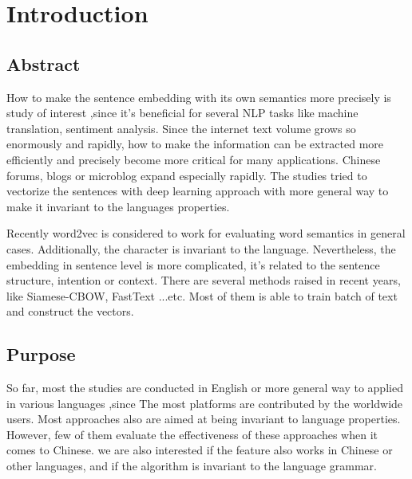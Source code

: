 \chapter{Introduction}
\setlength{\baselineskip}{1.5em}
\setlength{\parindent}{2em}
\setlength{\parskip}{1em}

\section{Abstract}

How to make the sentence embedding with its own semantics more precisely is study of interest
,since it's beneficial for several NLP tasks like machine translation, sentiment analysis. 
Since the internet text volume grows so enormously and rapidly, how to make the information can be extracted more efficiently and precisely become more critical for many applications.  
Chinese forums, blogs or microblog expand especially rapidly. The studies tried to vectorize the sentences with deep learning approach with more general way to make it invariant to the languages properties.  

Recently word2vec\cite{word2vec} is considered to work for evaluating word semantics in general cases.  
Additionally, the character is invariant to the language. Nevertheless, 
the embedding in sentence level is more complicated, it's related to the sentence structure,  
intention or context. There are several methods raised in recent years, like Siamese-CBOW, FastText ...etc. 
Most of them is able to train batch of text and construct the vectors.

\section{Purpose}

So far, most the studies are conducted in English or more general way to applied in various languages
,since The most platforms are contributed by the worldwide users. Most approaches also are aimed at being invariant to language properties. 
However, few of them evaluate the effectiveness of these approaches when it comes to Chinese.   
we are also interested if the feature also works in Chinese or other languages, and if the algorithm is invariant to the language grammar. 